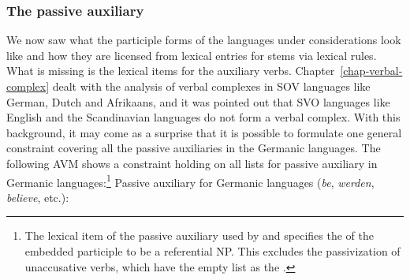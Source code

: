 
\subsubsection{The passive auxiliary}
\label{sec-auxiliary}

We now saw what the participle forms of the languages under considerations look like and how they are
licensed from lexical entries for stems via lexical rules. What is missing is the lexical items for
the auxiliary verbs. Chapter~\ref{chap-verbal-complex} dealt with the analysis of verbal complexes in SOV languages like
German, Dutch and Afrikaans, and it was pointed out that SVO languages like English and the
Scandinavian languages do not form a verbal complex. With this background, it may come as a surprise
that it is possible to formulate one general constraint covering all the passive auxiliaries in the
Germanic languages. The following AVM shows a constraint holding on all \argst lists for passive
auxiliary in Germanic languages:\footnote{%
The lexical item of the passive auxiliary used by \citet[]{Mueller2002b} and \citet[]{MOe2013a}
specifies the \dav of the embedded participle to be a referential NP. This excludes the
passivization of unaccusative verbs, which have the empty list as the \dav.
} 
\ea
\label{le-passive-aux-arg-st}
Passive auxiliary for Germanic languages (\emph{be}, \emph{werden}, \emph{believe}, etc.):\\
\z

\noindent

